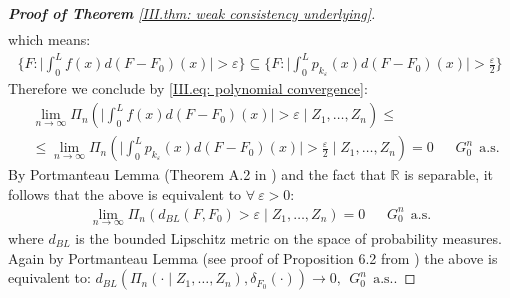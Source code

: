\begin{proof}[\hypertarget{III.proof weak consistency underlying}{\textbf{Proof of Theorem} \ref{III.thm: weak consistency underlying}}]
\begin{align*}
\end{align*}
which means:
\begin{align*}
    \bigg\{ F : \bigg| \int_0^L f(x) d(F - F_0) (x) \bigg| > \varepsilon \bigg\} \subseteq \bigg\{ F : \bigg| \int_0^L p_{k_{\varepsilon}}(x) d(F - F_0) (x) \bigg| > \frac{\varepsilon}{2} \bigg\} 
\end{align*}
Therefore we conclude by \eqref{III.eq: polynomial convergence}:
\begin{align*}
   & \lim_{n \rightarrow \infty} \Pi_n \left( \bigg| \int_0^L f(x)   d(F - F_0) (x) \bigg| > \varepsilon  \mid Z_1,\ldots,Z_n \right) \leq \\ 
    &\leq \lim_{n \rightarrow \infty} \Pi_n \left( \bigg| \int_0^L p_{k_{\varepsilon}}(x) d(F - F_0) (x) \bigg| > \frac{\varepsilon}{2} \mid Z_1,\ldots,Z_n \right)  = 0 \: \: \: \: \: \: \:  G^n_0 \: \: \text{a.s.}
\end{align*}
By Portmanteau Lemma (Theorem A.2 in \cite{4}) and the fact that $\mathbb{R}$ is separable, it follows that the above is equivalent to $\forall \: \varepsilon > 0$:
\begin{align*}
    \lim_{n \rightarrow \infty} \Pi_n \left( d_{\scriptscriptstyle{BL}} \left( F,F_0 \right) > \varepsilon \mid Z_1,\ldots,Z_n \right) = 0 \: \: \: \: \: \: \:  G^n_0 \: \: \text{a.s.}
\end{align*}
where $d_{\scriptscriptstyle{BL}}$ is the bounded Lipschitz metric on the space of probability measures. Again by Portmanteau Lemma (see proof of Proposition 6.2 from \cite{4}) the above is equivalent to: $d_{\scriptscriptstyle{BL}} \left( \Pi_n \left( \cdot \mid Z_1, \ldots,Z_n \right) , \delta_{F_0} (\cdot) \right) \rightarrow 0, \: \:  G^n_0 \: \: \text{a.s.}$.
\end{proof}

